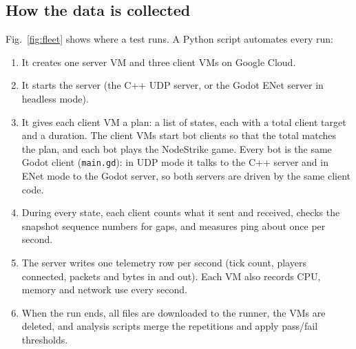 \IfFileExists{IEEEtran.cls}{\ieeetrue\documentclass[conference]{IEEEtran}}{\ieeefalse\documentclass[twocolumn,10pt]{article}}
\begin{document}
\subsection{How the data is collected}
Fig.~\ref{fig:fleet} shows where a test runs. A Python script automates every run:

\begin{enumerate}
\item It creates one server VM and three client VMs on Google Cloud.
\item It starts the server (the C++ UDP server, or the Godot ENet server in headless mode).
\item It gives each client VM a plan: a list of states, each with a
total client target and a duration. The client VMs start bot clients so that the
total matches the plan, and each bot plays the NodeStrike game. Every bot is the same Godot client (\texttt{main.gd}): in UDP mode it talks to the C++ server and in ENet mode to the Godot server, so both servers are driven by the same client code.
\item During every state, each client counts what it sent and received, checks
the snapshot sequence numbers for gaps, and measures ping about once per second.
\item The server writes one telemetry row per second (tick count, players
connected, packets and bytes in and out). Each VM also records CPU, memory and
network use every second.
\item When the run ends, all files are downloaded to the runner, the VMs are
deleted, and analysis scripts merge the repetitions and apply pass/fail
thresholds.
\end{enumerate}
\end{document}
